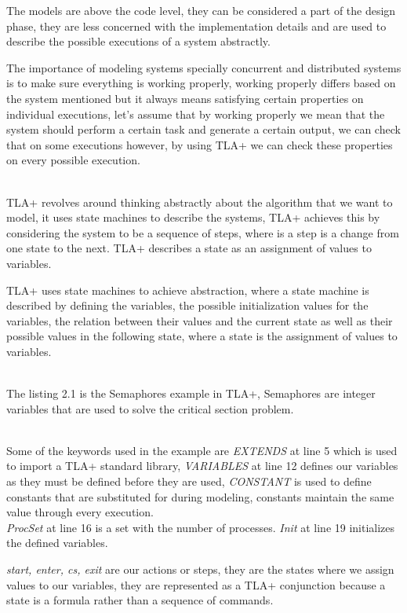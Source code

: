 \documentclass{thesul}
\begin{document}
The models are above the code level, they can be considered a part of the design phase, they are less concerned with the implementation details and are used to describe the possible executions of a system abstractly.

The importance of modeling systems specially concurrent and distributed systems is to make sure everything is working properly, working properly differs based on the system mentioned but it always means satisfying certain properties on individual executions, let's assume that by working properly we mean that the system should perform a certain task and generate a certain output, we can check that on some executions however, by using TLA+ we can check these properties on every possible execution.
 
\hfill\\
TLA+ revolves around thinking abstractly about the algorithm that we want to model, it uses state machines to describe the systems, TLA+ achieves this by considering the system to be a sequence of steps, where is a step is a change from one state to the next. TLA+ describes a state as an assignment of values to variables.

TLA+ uses state machines to achieve abstraction, where a state machine is described by defining the variables, the possible initialization values for the variables, the relation between their values and the current state as well as their possible values in the following state, where a state is the assignment of values to variables.

\hfill\\
The listing 2.1 is the Semaphores example in TLA+, Semaphores are integer variables that are used to solve the critical section problem.

\hfill\\
Some of the keywords used in the example are \textit{EXTENDS} at line 5 which is used to import a TLA+ standard library,  \textit{VARIABLES} at line 12 defines our variables as they must be defined before they are used, \textit{CONSTANT} is used to define constants that are substituted for during modeling, constants maintain the same value through every execution.
\hfill\\

\textit{ProcSet} at line 16 is a set with the number of processes. \textit{Init} at line 19 initializes the defined variables.

\textit{start, enter, cs, exit} are our actions or steps, they are the states where we assign values to our variables, they are represented as a TLA+ conjunction because a state is a formula rather than a sequence of commands.
\end{document}
